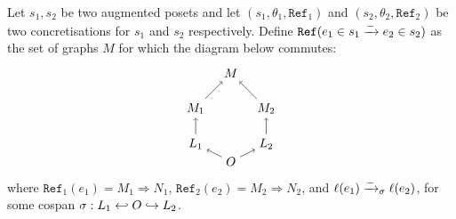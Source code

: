 \begin{definition}
  \label{def:ref_neg_infl}
  Let $s_1,s_2$ be two augmented posets and let $(s_1,\theta_1,\mathtt{Ref}_1)$ and $(s_2,\theta_2,\mathtt{Ref}_2)$ be two concretisations for $s_1$ and $s_2$ respectively.
  Define $\mathtt{Ref}(e_1\in s_1\mathrel{\xrightarrow{-}} e_2\in s_2)$ as the set of graphs $M$ for which the diagram below commutes:
  \[
  \begin{tikzpicture} %
    \node (o) at (0,-0.5) {\(O\)};
    \node (n) at (0,2) {\(M\)};
    \node (l1) at (-1,0) {\(L_1\)};
    \node (l2) at (1,0) {\(L_2\)};
    \node (n1) at (-1,1) {\(M_1\)};
    \node (n2) at (1,1) {\(M_2\)};
    \draw [->] (l1) -- (n1);
    \draw [->] (l2) -- (n2);
    \draw [->] (o) -- (l1);
    \draw [->] (o) -- (l2);
    \draw [->] (n1) -- (n);
    \draw [->] (n2) -- (n);
  \end{tikzpicture}
  \]
  where $\mathtt{Ref}_1(e_1) = M_1\Rightarrow N_1$, $\mathtt{Ref}_2(e_2) = M_2\Rightarrow N_2$, and $\ell(e_1)\mathrel{\xrightarrow{-}}_{\sigma}\ell(e_2)$, for some cospan $\sigma:L_1\hookleftarrow O\hookrightarrow L_2$.
\end{definition}
